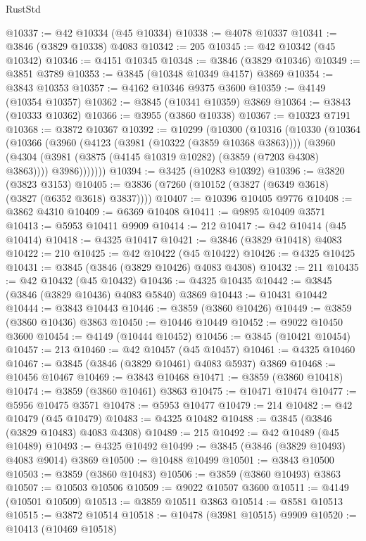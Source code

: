\begin{lexlean}{RustStd}
\begin{coremodule}
@10337 := @42 @10334 (@45 @10334)
@10338 := @4078 @10337
@10341 := @3846 (@3829 @10338) @4083
@10342 := 205
@10345 := @42 @10342 (@45 @10342)
@10346 := @4151 @10345
@10348 := @3846 (@3829 @10346)
@10349 := @3851 @3789
@10353 := @3845 (@10348 @10349 @4157) @3869
@10354 := @3843 @10353
@10357 := @4162 @10346 @9375 @3600
@10359 := @4149 (@10354 @10357)
@10362 := @3845 (@10341 @10359) @3869
@10364 := @3843 (@10333 @10362)
@10366 := @3955 (@3860 @10338)
@10367 := @10323 @7191
@10368 := @3872 @10367
@10392 := @10299
    (@10300
      (@10316
        (@10330
          (@10364
            (@10366
              (@3960
                (@4123 (@3981 (@10322 (@3859 @10368 @3863))))
                (@3960
                  (@4304 (@3981 (@3875 (@4145 @10319 @10282) (@3859 (@7203 @4308) @3863))))
                  @3986)))))))
@10394 := @3425 (@10283 @10392)
@10396 := @3820 (@3823 @3153)
@10405 := @3836 (@7260 (@10152 (@3827 (@6349 @3618) (@3827 (@6352 @3618) @3837))))
@10407 := @10396 @10405 @9776
@10408 := @3862 @4310
@10409 := @6369 @10408
@10411 := @9895 @10409 @3571
@10413 := @5953 @10411 @9909
@10414 := 212
@10417 := @42 @10414 (@45 @10414)
@10418 := @4325 @10417
@10421 := @3846 (@3829 @10418) @4083
@10422 := 210
@10425 := @42 @10422 (@45 @10422)
@10426 := @4325 @10425
@10431 := @3845 (@3846 (@3829 @10426) @4083 @4308)
@10432 := 211
@10435 := @42 @10432 (@45 @10432)
@10436 := @4325 @10435
@10442 := @3845 (@3846 (@3829 @10436) @4083 @5840) @3869
@10443 := @10431 @10442
@10444 := @3843 @10443
@10446 := @3859 (@3860 @10426)
@10449 := @3859 (@3860 @10436) @3863
@10450 := @10446 @10449
@10452 := @9022 @10450 @3600
@10454 := @4149 (@10444 @10452)
@10456 := @3845 (@10421 @10454)
@10457 := 213
@10460 := @42 @10457 (@45 @10457)
@10461 := @4325 @10460
@10467 := @3845 (@3846 (@3829 @10461) @4083 @5937) @3869
@10468 := @10456 @10467
@10469 := @3843 @10468
@10471 := @3859 (@3860 @10418)
@10474 := @3859 (@3860 @10461) @3863
@10475 := @10471 @10474
@10477 := @5956 @10475 @3571
@10478 := @5953 @10477
@10479 := 214
@10482 := @42 @10479 (@45 @10479)
@10483 := @4325 @10482
@10488 := @3845 (@3846 (@3829 @10483) @4083 @4308)
@10489 := 215
@10492 := @42 @10489 (@45 @10489)
@10493 := @4325 @10492
@10499 := @3845 (@3846 (@3829 @10493) @4083 @9014) @3869
@10500 := @10488 @10499
@10501 := @3843 @10500
@10503 := @3859 (@3860 @10483)
@10506 := @3859 (@3860 @10493) @3863
@10507 := @10503 @10506
@10509 := @9022 @10507 @3600
@10511 := @4149 (@10501 @10509)
@10513 := @3859 @10511 @3863
@10514 := @8581 @10513
@10515 := @3872 @10514
@10518 := @10478 (@3981 @10515) @9909
@10520 := @10413 (@10469 @10518)

\end{coremodule}
\end{lexlean}
